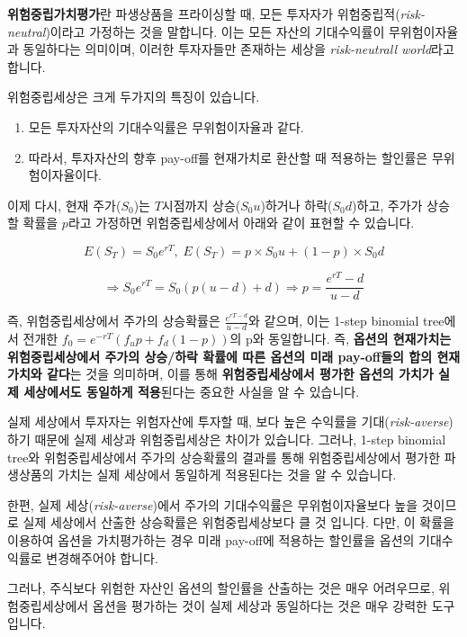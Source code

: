 \documentclass[
  letterpaper,
  DIV=11,
  numbers=noendperiod]{scrreprt}
\providecommand{\tightlist}{%
  \setlength{\itemsep}{0pt}\setlength{\parskip}{0pt}}\usepackage{longtable,booktabs,array}
\begin{document}
\textbf{위험중립가치평가}란 파생상품을 프라이싱할 때, 모든 투자자가
위험중립적(\emph{risk-neutral})이라고 가정하는 것을 말합니다. 이는 모든
자산의 기대수익률이 무위험이자율과 동일하다는 의미이며, 이러한
투자자들만 존재하는 세상을 \emph{risk-neutrall world}라고 합니다.

위험중립세상은 크게 두가지의 특징이 있습니다.

\begin{enumerate}
\def\labelenumi{(\arabic{enumi})}
\tightlist
\item
  모든 투자자산의 기대수익률은 무위험이자율과 같다.
\item
  따라서, 투자자산의 향후 pay-off를 현재가치로 환산할 때 적용하는
  할인률은 무위험이자율이다.
\end{enumerate}

이제 다시, 현재 주가(\(S_0\))는 \(T\)시점까지 상승(\(S_0u\))하거나
하락(\(S_0d\))하고, 주가가 상승할 확률을 \(p\)라고 가정하면
위험중립세상에서 아래와 같이 표현할 수 있습니다.

\[E(S_T)=S_0e^{rT},\;E(S_T)=p\times S_0u+(1-p)\times S_0d\]

\[\Rightarrow S_0e^{rT}=S_0(p(u-d)+d)\Rightarrow p=\frac{e^{rT}-d}{u-d}\]

즉, 위험중립세상에서 주가의 상승확률은 \(\frac{e^{rT-d}}{u-d}\)와
같으며, 이는 1-step binomial tree에서 전개한
\(f_0=e^{-rT}(f_up+f_d(1-p))\)의 p와 동일합니다. 즉, \textbf{옵션의
현재가치는 위험중립세상에서 주가의 상승/하락 확률에 따른 옵션의 미래
pay-off들의 합의 현재가치와 같다}는 것을 의미하며, 이를 통해
\textbf{위험중립세상에서 평가한 옵션의 가치가 실제 세상에서도 동일하게
적용}된다는 중요한 사실을 알 수 있습니다.

\begin{tcolorbox}[enhanced jigsaw, toprule=.15mm, breakable, left=2mm, leftrule=.75mm, opacitybacktitle=0.6, coltitle=black, rightrule=.15mm, colback=white, titlerule=0mm, bottomtitle=1mm, colframe=quarto-callout-tip-color-frame, title=\textcolor{quarto-callout-tip-color}{\faLightbulb}\hspace{0.5em}{Tip}, toptitle=1mm, arc=.35mm, colbacktitle=quarto-callout-tip-color!10!white, opacityback=0, bottomrule=.15mm]

실제 세상에서 투자자는 위험자산에 투자할 때, 보다 높은 수익률을
기대(\emph{risk-averse})하기 때문에 실제 세상과 위험중립세상은 차이가
있습니다. 그러나, 1-step binomial tree와 위험중립세상에서 주가의
상승확률의 결과를 통해 위험중립세상에서 평가한 파생상품의 가치는 실제
세상에서 동일하게 적용된다는 것을 알 수 있습니다.

한편, 실제 세상(\emph{risk-averse})에서 주가의 기대수익률은
무위험이자율보다 높을 것이므로 실제 세상에서 산출한 상승확률은
위험중립세상보다 클 것 입니다. 다만, 이 확률을 이용하여 옵션을
가치평가하는 경우 미래 pay-off에 적용하는 할인률을 옵션의 기대수익률로
변경해주어야 합니다.

그러나, 주식보다 위험한 자산인 옵션의 할인률을 산출하는 것은 매우
어려우므로, 위험중립세상에서 옵션을 평가하는 것이 실제 세상과 동일하다는
것은 매우 강력한 도구입니다.

\end{tcolorbox}
\end{document}
